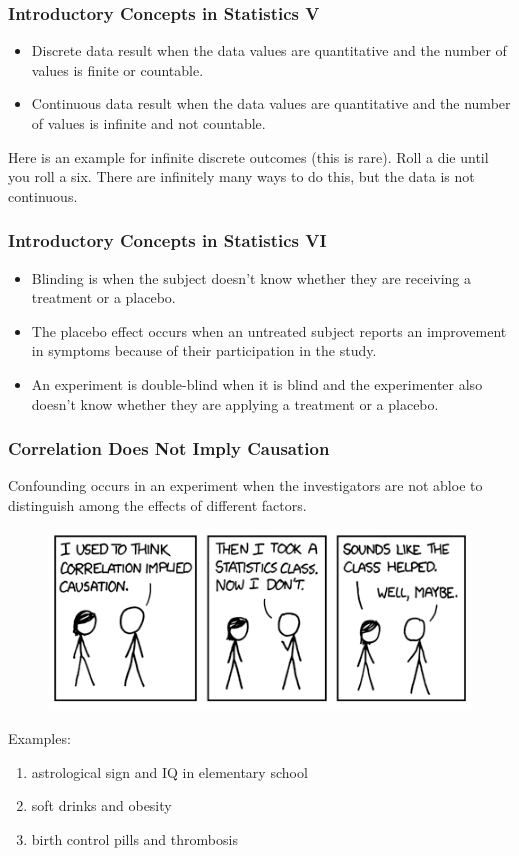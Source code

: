 \documentclass[xcolor=dvipsnames]{beamer}
\begin{document}
\begin{frame}
  \frametitle{Introductory Concepts in Statistics V}
  \begin{itemize}
  \item<1-> \alert{Discrete} data result when the data values are
    quantitative and the number of values is finite or countable.
  \item<2-> \alert{Continuous} data result when the data values are
    quantitative and the number of values is infinite and not
    countable.
  \end{itemize}
Here is an example for infinite discrete outcomes (this is rare). Roll
a die until you roll a six. There are infinitely many ways to do this,
but the data is not continuous.
\end{frame}

\begin{frame}
  \frametitle{Introductory Concepts in Statistics VI}
  \begin{itemize}
  \item<1-> \alert{Blinding} is when the subject doesn't know whether
    they are receiving a treatment or a placebo.
  \item<2-> The \alert{placebo effect} occurs when an untreated
    subject reports an improvement in symptoms because of their
    participation in the study.
  \item<3-> An experiment is \alert{double-blind} when it is blind and
    the experimenter also doesn't know whether they are applying a
    treatment or a placebo.
  \end{itemize}
\end{frame}

\begin{frame}
  \frametitle{Correlation Does Not Imply Causation}
\alert{Confounding} occurs in an experiment when the investigators are
not abloe to distinguish among the effects of different factors.
\begin{figure}[h]
\includegraphics[scale=.3]{./xkcd-causation-correlation.png}
\end{figure}
Examples: 
\begin{enumerate}
\item<1-> astrological sign and IQ in elementary school
\item<2-> soft drinks and obesity
\item<3-> birth control pills and thrombosis
\end{enumerate}
\end{frame}
\end{document}
